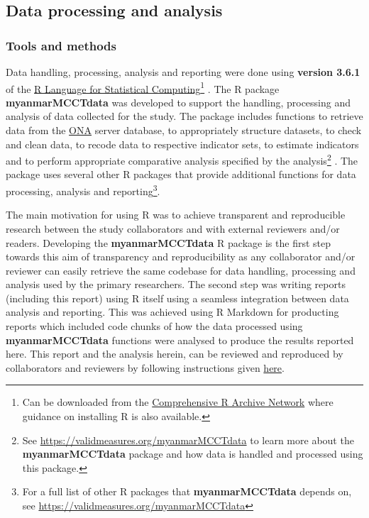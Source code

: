\documentclass[12pt,a4paper]{article}
\let\rmarkdownfootnote\footnote%
\def\footnote{\protect\rmarkdownfootnote}
\begin{document}
\hypertarget{analysis}{%
\subsection{Data processing and analysis}\label{analysis}}

\hypertarget{processing-tools}{%
\subsubsection{Tools and methods}\label{processing-tools}}

Data handling, processing, analysis and reporting were done using \textbf{version 3.6.1} of the \href{https://cran.r-project.org}{R Language for Statistical Computing}\footnote{Can be downloaded from the \href{https://cran.r-project.org}{Comprehensive R Archive Network} where guidance on installing R is also available.} \citep{R2019}. The R package \textbf{myanmarMCCTdata} was developed to support the handling, processing and analysis of data collected for the study. The package includes functions to retrieve data from the \href{https://ona.io}{ONA} server database, to appropriately structure datasets, to check and clean data, to recode data to respective indicator sets, to estimate indicators and to perform appropriate comparative analysis specified by the analysis\footnote{See \url{https://validmeasures.org/myanmarMCCTdata} to learn more about the \textbf{myanmarMCCTdata} package and how data is handled and processed using this package.} \citep{myanmarData2019}. The package uses several other R packages that provide additional functions for data processing, analysis and reporting\footnote{For a full list of other R packages that \textbf{myanmarMCCTdata} depends on, see \url{https://validmeasures.org/myanmarMCCTdata}}.

The main motivation for using R was to achieve transparent and reproducible research between the study collaborators and with external reviewers and/or readers. Developing the \textbf{myanmarMCCTdata} R package is the first step towards this aim of transparency and reproducibility as any collaborator and/or reviewer can easily retrieve the same codebase for data handling, processing and analysis used by the primary researchers. The second step was writing reports (including this report) using R itself using a seamless integration between data analysis and reporting. This was achieved using R Markdown \citep{rmarkdown2018} for producting reports which included code chunks of how the data processed using \textbf{myanmarMCCTdata} functions were analysed to produce the results reported here. This report and the analysis herein, can be reviewed and reproduced by collaborators and reviewers by following instructions given \href{https://github.com/validmeasures/myanmarMCCTkayin}{here}.
\end{document}
